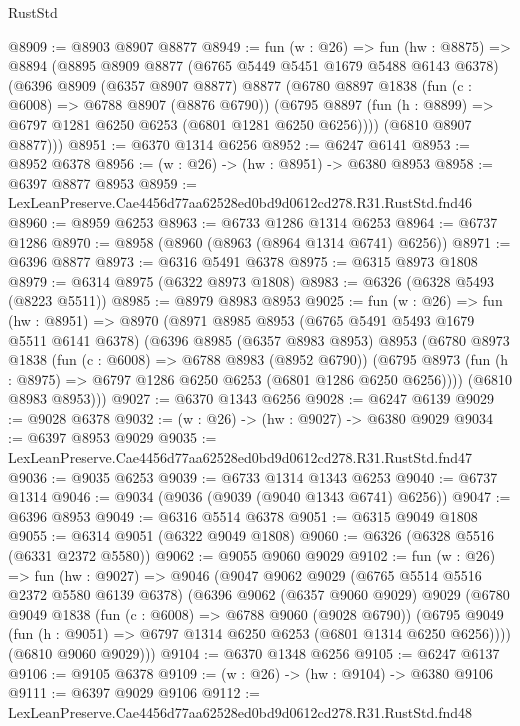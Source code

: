 \begin{lexlean}{RustStd}
\begin{coremodule}
@8909 := @8903 @8907 @8877
@8949 := fun (w : @26) =>
  fun (hw : @8875) =>
  @8894
    (@8895
      @8909
      @8877
      (@6765 @5449 @5451 @1679 @5488 @6143 @6378)
      (@6396
        @8909
        (@6357 @8907 @8877)
        @8877
        (@6780
          @8897
          @1838
          (fun (c : @6008) => @6788 @8907 (@8876 @6790))
          (@6795 @8897 (fun (h : @8899) => @6797 @1281 @6250 @6253 (@6801 @1281 @6250 @6256))))
        (@6810 @8907 @8877)))
@8951 := @6370 @1314 @6256
@8952 := @6247 @6141
@8953 := @8952 @6378
@8956 := (w : @26) -> (hw : @8951) -> @6380 @8953
@8958 := @6397 @8877 @8953
@8959 := LexLeanPreserve.Cae4456d77aa62528ed0bd9d0612cd278.R31.RustStd.fnd46
@8960 := @8959 @6253
@8963 := @6733 @1286 @1314 @6253
@8964 := @6737 @1286
@8970 := @8958 (@8960 (@8963 (@8964 @1314 @6741) @6256))
@8971 := @6396 @8877
@8973 := @6316 @5491 @6378
@8975 := @6315 @8973 @1808
@8979 := @6314 @8975 (@6322 @8973 @1808)
@8983 := @6326 (@6328 @5493 (@8223 @5511))
@8985 := @8979 @8983 @8953
@9025 := fun (w : @26) =>
  fun (hw : @8951) =>
  @8970
    (@8971
      @8985
      @8953
      (@6765 @5491 @5493 @1679 @5511 @6141 @6378)
      (@6396
        @8985
        (@6357 @8983 @8953)
        @8953
        (@6780
          @8973
          @1838
          (fun (c : @6008) => @6788 @8983 (@8952 @6790))
          (@6795 @8973 (fun (h : @8975) => @6797 @1286 @6250 @6253 (@6801 @1286 @6250 @6256))))
        (@6810 @8983 @8953)))
@9027 := @6370 @1343 @6256
@9028 := @6247 @6139
@9029 := @9028 @6378
@9032 := (w : @26) -> (hw : @9027) -> @6380 @9029
@9034 := @6397 @8953 @9029
@9035 := LexLeanPreserve.Cae4456d77aa62528ed0bd9d0612cd278.R31.RustStd.fnd47
@9036 := @9035 @6253
@9039 := @6733 @1314 @1343 @6253
@9040 := @6737 @1314
@9046 := @9034 (@9036 (@9039 (@9040 @1343 @6741) @6256))
@9047 := @6396 @8953
@9049 := @6316 @5514 @6378
@9051 := @6315 @9049 @1808
@9055 := @6314 @9051 (@6322 @9049 @1808)
@9060 := @6326 (@6328 @5516 (@6331 @2372 @5580))
@9062 := @9055 @9060 @9029
@9102 := fun (w : @26) =>
  fun (hw : @9027) =>
  @9046
    (@9047
      @9062
      @9029
      (@6765 @5514 @5516 @2372 @5580 @6139 @6378)
      (@6396
        @9062
        (@6357 @9060 @9029)
        @9029
        (@6780
          @9049
          @1838
          (fun (c : @6008) => @6788 @9060 (@9028 @6790))
          (@6795 @9049 (fun (h : @9051) => @6797 @1314 @6250 @6253 (@6801 @1314 @6250 @6256))))
        (@6810 @9060 @9029)))
@9104 := @6370 @1348 @6256
@9105 := @6247 @6137
@9106 := @9105 @6378
@9109 := (w : @26) -> (hw : @9104) -> @6380 @9106
@9111 := @6397 @9029 @9106
@9112 := LexLeanPreserve.Cae4456d77aa62528ed0bd9d0612cd278.R31.RustStd.fnd48

\end{coremodule}
\end{lexlean}
